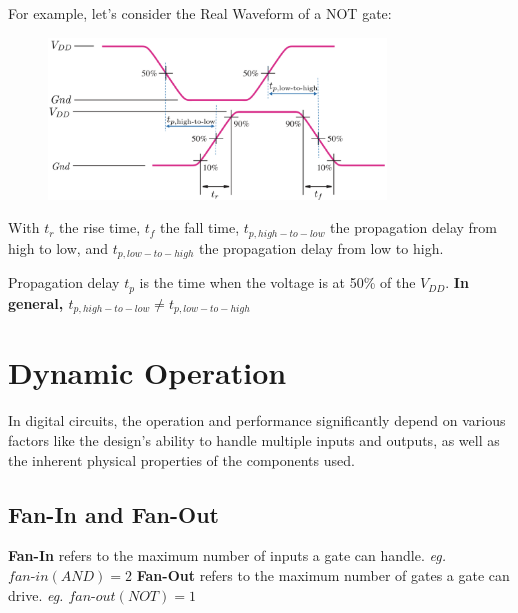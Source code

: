 \documentclass[12pt,openany]{book}
\newcommand{\minidash}{\text{-}}
\begin{document}
			      	\vspace*{10px}
			      	For example, let's consider the Real Waveform of a NOT gate:
			      	\begin{figure}[h]
			      		\centering
			      		\includegraphics[width=0.8\textwidth]{circuits/9.3.2.png} 
			      	\end{figure}
			      	
			      	With $t_r$ the rise time, $t_f$ the fall time, $t_{p,high-to-low}$ the propagation delay from high to low, and $t_{p,low-to-high}$ the propagation delay from low to high. \newline
			      	
			      	Propagation delay $t_p$ is the time when the voltage is at 50\% of the $V_{DD}$.\newline 
			      	\textbf{In general, $t_{p,high-to-low} \neq t_{p,low-to-high}$} \newline
			      	\newpage
			      	\section{Dynamic Operation}
			      	
			      	In digital circuits, the operation and performance significantly depend on various factors like the design's ability to handle multiple inputs and outputs, as well as the inherent physical properties of the components used. 
			      	
			      	\subsection{Fan-In and Fan-Out}
			      	
			      	\textbf{Fan-In} refers to the maximum number of inputs a gate can handle. \textit{eg. $fan\minidash{}in(AND) = 2$}
			      	\vspace{10px}
			      	\newline
			      	\textbf{Fan-Out} refers to the maximum number of gates a gate can drive. \textit{eg. $fan\minidash{}out(NOT) = 1$}
			      	
\end{document}
